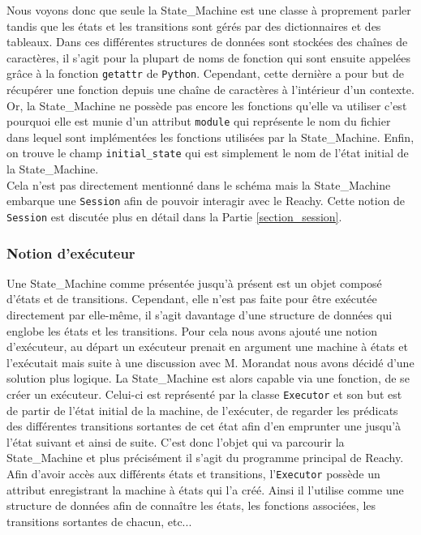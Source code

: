 \documentclass[a4paper,french]{article}
\begin{document}
Nous voyons donc que seule la State\_Machine est une classe à proprement parler tandis que les états et les transitions sont gérés par des dictionnaires et des tableaux. Dans ces différentes structures de données sont stockées des chaînes de caractères, il s'agit pour la plupart de noms de fonction qui sont ensuite appelées grâce à la fonction \texttt{getattr} de \texttt{Python}. Cependant, cette dernière a pour but de récupérer une fonction depuis une chaîne de caractères à l'intérieur d'un contexte. Or, la State\_Machine ne possède pas encore les fonctions qu'elle va utiliser c'est pourquoi elle est munie d'un attribut \texttt{module} qui représente le nom du fichier dans lequel sont implémentées les fonctions utilisées par la State\_Machine. Enfin, on trouve le champ \texttt{initial\_state} qui est simplement le nom de l'état initial de la State\_Machine. \\

Cela n'est pas directement mentionné dans le schéma mais la State\_Machine embarque une \texttt{Session} afin de pouvoir interagir avec le Reachy. Cette notion de \texttt{Session} est discutée plus en détail dans la Partie \ref{section_session}. 

\subsubsection{Notion d'exécuteur}

Une State\_Machine comme présentée jusqu'à présent est un objet composé d'états et de transitions. Cependant, elle n'est pas faite pour être exécutée directement par elle-même, il s'agit davantage d'une structure de données qui englobe les états et les transitions. Pour cela nous avons ajouté une notion d'exécuteur, au départ un exécuteur prenait en argument une machine à états et l'exécutait mais suite à une discussion avec M. Morandat nous avons décidé d'une solution plus logique. La State\_Machine est alors capable via une fonction, de se créer un exécuteur. Celui-ci est représenté par la classe \texttt{Executor} et son but est de partir de l'état initial de la machine, de l'exécuter, de regarder les prédicats des différentes transitions sortantes de cet état afin d'en emprunter une jusqu'à l'état suivant et ainsi de suite. C'est donc l'objet qui va parcourir la State\_Machine et plus précisément il s'agit du programme principal de Reachy. Afin d'avoir accès aux différents états et transitions, l'\texttt{Executor} possède un attribut enregistrant la machine à états qui l'a créé. Ainsi il l'utilise comme une structure de données afin de connaître les états, les fonctions associées, les transitions sortantes de chacun, etc...\\
\end{document}
